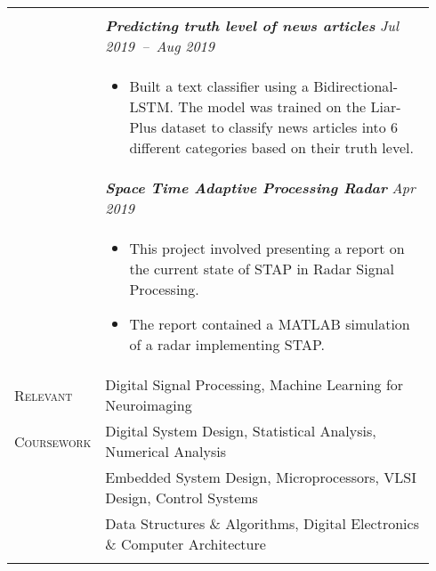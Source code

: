\documentclass[letterpaper, 10pt, oneside]{article}
\newcommand{\stitle}[1]{\normalsize{\textsc{#1}}}
\newcommand{\bdit}[1]{\textit{\textbf{#1}}}
\begin{document}
\begin{longtable}{@{} p{0.14\linewidth} p{0.8\linewidth}}
{\begin{itemize}[leftmargin=*, itemsep=-0.88ex]
                        \end{itemize}
                    }  
\\
                  & \bdit{Predicting truth level of news articles} \hfill \textit{Jul 2019\ --\ Aug 2019} \\
                  & \parbox{0.8\textwidth}{
                        \begin{itemize}[leftmargin=*, itemsep=-0.88ex]
                            \item Built a text classifier using a Bidirectional-LSTM. 
                                  The model was trained on the Liar-Plus dataset to classify news articles into 
                                  6 different categories based on their truth level.
                        \end{itemize}
                    }  
\\
                  & \bdit{Space Time Adaptive Processing Radar} \hfill \textit{Apr 2019} \\
                  & \parbox{0.8\textwidth}{
                        \begin{itemize}[leftmargin=*, itemsep=-0.88ex]
                            \item This project involved presenting a report on the current state of STAP in Radar Signal Processing.
                            \item The report contained a MATLAB simulation of a radar implementing STAP.
                        \end{itemize}
                    }  
\\


\stitle{Relevant}   & Digital Signal Processing, Machine Learning for Neuroimaging \\
\stitle{Coursework} & Digital System Design, Statistical Analysis, Numerical Analysis \\
                    & Embedded System Design, Microprocessors, VLSI Design, Control Systems \\
                    & Data Structures \& Algorithms, Digital Electronics \& Computer Architecture \\
\\




%



\end{longtable}
\end{document}

